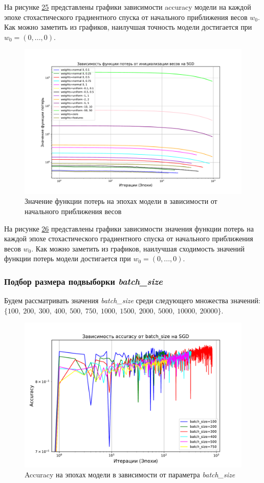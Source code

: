 \documentclass[14pt]{extarticle}
\begin{document}
На рисунке \hyperref[fig:exp_5_acc_alpha_1]{25} представлены графики зависимости accuracy модели на каждой эпохе стохастического градиентного спуска от начального приближения весов \textit{$ w_0 $}. Как можно заметить из графиков, наилучшая точность модели достигается при \textit{$ w_0 = (0, ... , 0)$}.

\begin{figure}[H]
    \centering
    \includegraphics[width=1\linewidth]
    {exp_5_loss_weights.pdf}
    \caption{Значение функции потерь на эпохах модели в зависимости от начального приближения весов}
    \label{fig:exp_5_loss_weights}
\end{figure}

На рисунке \hyperref[fig:exp_5_loss_alpha_1]{26} представлены графики зависимости значения функции потерь на каждой эпохе стохастического градиентного спуска от начального приближения весов \textit{$ w_0 $}. Как можно заметить из графиков, наилучшая сходимость значений функции потерь модели достигается при \textit{$ w_0 = (0, ... , 0)$}.

\subsubsection{Подбор размера подвыборки \textit{batch\_size}}

Будем рассматривать значения \textit{batch\_size} среди следующего множества значений: \( \{100, \ 200, \ 300, \ 400, \ 500, \ 750, \ 1000, \ 1500, \ 2000, \ 5000, \ 10000, \ 20000\} \).

\begin{figure}[H]
    \centering
    \includegraphics[width=0.7\linewidth]
    {exp_5_acc_batches_1.pdf}
    \caption{Accuracy на эпохах модели в зависимости от параметра \textit{batch\_size}}
    \label{fig:exp_5_acc_batches_1}
\end{figure}
\end{document}
